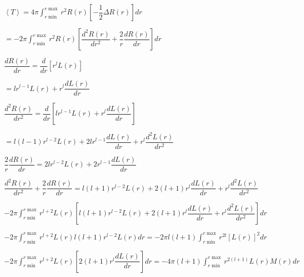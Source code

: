 \documentclass{jarticle}%
\begin{document}
$\left\langle T\right\rangle =4\pi%
{\displaystyle\int\nolimits_{r\min}^{r\max}}
r^{2}R\left(  r\right)  \left[  -\dfrac{1}{2}\Delta R\left(  r\right)
\right]  dr$

$=-2\pi%
{\displaystyle\int\nolimits_{r\min}^{r\max}}
r^{2}R\left(  r\right)  \left[  \dfrac{d^{2}R\left(  r\right)  }{dr^{2}%
}+\dfrac{2}{r}\dfrac{dR\left(  r\right)  }{dr}\right]  dr$

$\dfrac{dR\left(  r\right)  }{dr}=\dfrac{d}{dr}\left[  r^{l}L\left(  r\right)
\right]  $

$=lr^{l-1}L\left(  r\right)  +r^{l}\dfrac{dL\left(  r\right)  }{dr}$

$\dfrac{d^{2}R\left(  r\right)  }{dr^{2}}=\dfrac{d}{dr}\left[  lr^{l-1}%
L\left(  r\right)  +r^{l}\dfrac{dL\left(  r\right)  }{dr}\right]  $

$=l\left(  l-1\right)  r^{l-2}L\left(  r\right)  +2lr^{l-1}\dfrac{dL\left(
r\right)  }{dr}+r^{l}\dfrac{d^{2}L\left(  r\right)  }{dr^{2}}$

$\dfrac{2}{r}\dfrac{dR\left(  r\right)  }{dr}=2lr^{l-2}L\left(  r\right)
+2r^{l-1}\dfrac{dL\left(  r\right)  }{dr}$

$\dfrac{d^{2}R\left(  r\right)  }{dr^{2}}+\dfrac{2}{r}\dfrac{dR\left(
r\right)  }{dr}=l\left(  l+1\right)  r^{l-2}L\left(  r\right)  +2\left(
l+1\right)  r^{l}\dfrac{dL\left(  r\right)  }{dr}+r^{l}\dfrac{d^{2}L\left(
r\right)  }{dr^{2}}$

$-2\pi%
{\displaystyle\int\nolimits_{r\min}^{r\max}}
r^{l+2}L\left(  r\right)  \left[  l\left(  l+1\right)  r^{l-2}L\left(
r\right)  +2\left(  l+1\right)  r^{l}\dfrac{dL\left(  r\right)  }{dr}%
+r^{l}\dfrac{d^{2}L\left(  r\right)  }{dr^{2}}\right]  dr$

$-2\pi%
{\displaystyle\int\nolimits_{r\min}^{r\max}}
r^{l+2}L\left(  r\right)  l\left(  l+1\right)  r^{l-2}L\left(  r\right)
dr=-2\pi l\left(  l+1\right)
{\displaystyle\int\nolimits_{r\min}^{r\max}}
r^{2l}\left[  L\left(  r\right)  \right]  ^{2}dr$

$-2\pi%
{\displaystyle\int\nolimits_{r\min}^{r\max}}
r^{l+2}L\left(  r\right)  \left[  2\left(  l+1\right)  r^{l}\dfrac{dL\left(
r\right)  }{dr}\right]  dr=-4\pi\left(  l+1\right)
{\displaystyle\int\nolimits_{r\min}^{r\max}}
r^{2\left(  l+1\right)  }L\left(  r\right)  M\left(  r\right)  dr$
\end{document}
